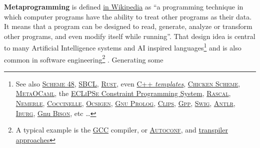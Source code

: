 \documentclass{IEEEtran}
\begin{document}
\textbf{Metaprogramming}  is defined
\href{https://en.wikipedia.org/wiki/Metaprogramming}{in Wikipedia} as
``a programming technique in which computer programs have the ability
to treat other programs as their data. It means that a program can be
designed to read, generate, analyze or transform other programs, and
even modify itself while running''. That design idea is central to
many Artificial Intelligence systems and AI inspired
languages\footnote{See also \href{http://s48.org}{\textsc{Scheme 48}},
\href{http://sbcl.org/}{\textsc{SBCL}},
\href{http://https://www.rust-lang.org/}{\textsc{Rust}}, even
\href{https://en.cppreference.com/w/cpp/language/templates}{C++
  \emph{templates}}, \href{https://www.call-cc.org/}{\textsc{Chicken
    Scheme}}, \href{
  http://okmij.org/ftp/ML/MetaOCaml.html}{\textsc{MetaOCaml}}, the
\href{http://eclipseclp.org/}{\textsc{ECLiPSe} Constraint Programming
  System}, \href{https://www.rascal-mpl.org/}{\textsc{Rascal}},
\href{http://nemerle.org/}{\textsc{Nemerle}},
\href{http://coccinelle.lip6.fr/}{\textsc{Coccinelle}},
\href{{https://ocsigen.org/}}{\textsc{Ocsigen}},
\href{http://www.gprolog.org/}{\textsc{Gnu Prolog}},
\href{http://www.clipsrules.net/}{\textsc{Clips}},
\href{https://logological.org/gpp}{\textsc{Gpp}},
\href{http://swig.org/}{\textsc{Swig}},
\href{https://www.antlr.org/}{\textsc{Antlr}},
\href{https://github.com/drh/iburg}{\textsc{Iburg}},
\href{https://www.gnu.org/software/bison/}{Gnu \textsc{Bison}}, etc
\ldots} and is also common in software engineering\footnote{A typical
example is the \href{http://gcc.gnu.org}{\textsc{GCC}} compiler, or
\href{https://en.wikipedia.org/wiki/Autoconf}{\textsc{Autoconf}}, and
\href{https://en.wikipedia.org/wiki/Source-to-source_compiler}{transpiler
  approaches}} \cite{Lenat:1983:Eurisko, Lenat:1983:theory,
  Lenat:1991:ev-cycl, Pitrat:1996:FGCS, Pitrat:2009:AST,
  Pitrat:2009:ArtifBeings, Pitrat:blog, Queinnec:1996:LSP,
  Queinnec:2004:ContinWeb, Starynkevitch-1990-EUM,
  Starynkevitch-DSL2011, Starynkevitch-GCCMELTweb,
  Starynkevitch:2007:Multistage, Starynkevitch:2019:bismon-draft,
  Tschudin:2005:HarnessingSC, abelson:1996:sicp, briot:1987:uniform,
  chambers:1991:efficient, cointe:1987:metaclasses, dormoy:1992:meta,
  fouet-starynkevitch:describing-control:1987,
  greiner:1980:representation,
  hernandez-phillips:2019:debugging-bootstrap,hofstadter:2007:strange-loop,
  kay:1996:early-smalltalk, kelsey:1998:r5rs,
  kumar:2015:importance-expert-systems, matthews:2005:operational,
  mazur:2004:compile, nigro:2008:meta, queinnec:2003:lisp,
  Starynkevitch:2009:grow, serrano:1995:bigloo}.  Generating some
\end{document}
